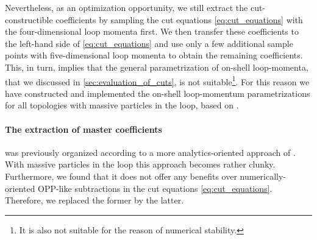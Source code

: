 Nevertheless, as an optimization opportunity,
we still extract the cut-constructible coefficients by sampling 
the cut equations \eqref{eq:cut_equations} 
with the four-dimensional loop momenta first.
We then transfer these coefficients to the left-hand side of \cref{eq:cut_equations} and use only a few additional
sample points with five-dimensional loop momenta to obtain the remaining coefficients.
This, in turn, implies that the general parametrization of on-shell loop-momenta, that we discussed in \cref{sec:evaluation_of_cuts},
is not suitable\footnote{
  It is also not suitable for the reason of numerical stability.
}. For this reason we have constructed and implemented the on-shell loop-momentum parametrizations
for all topologies with massive particles in the loop, based on \cite{Kilgore:2007qr}.



\paragraph{The extraction of master coefficients} was previously organized according to a more analytics-oriented approach of \cite{Forde2007}.
With massive particles in the loop this approach becomes rather clunky.
Furthermore, we found that it does not offer any benefits over numerically-oriented OPP-like subtractions
in the cut equations \eqref{eq:cut_equations}. Therefore, we replaced the former by the latter.


